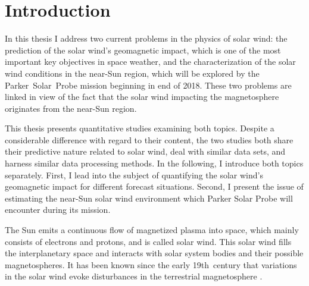 
\chapter{Introduction}
\label{chap:introduction}

In this thesis I address two current problems in the physics of solar wind: the prediction of the solar wind's geomagnetic impact, which is one of the most important key objectives in space weather, and the characterization of the solar wind conditions in the near-Sun region, which will be explored by the Parker~Solar~Probe mission beginning in end of 2018. These two problems are linked in view of the fact that the solar wind impacting the magnetosphere originates from the near-Sun region.

This thesis presents quantitative studies examining both topics. Despite a considerable difference with regard to their content, the two studies both share their predictive nature related to solar wind, deal with similar data sets, and harness similar data processing methods.
In the following, I introduce both topics separately. First, I lead into the subject of quantifying the solar wind's geomagnetic impact for different forecast situations. Second, I present the issue of estimating the near-Sun solar wind environment which Parker Solar Probe will encounter during its mission.

\bigskip


The Sun emits a continuous flow of magnetized plasma into space, which mainly consists of electrons and protons, and is called solar wind. This solar wind fills the interplanetary space and interacts with solar system bodies and their possible magnetospheres. It has been known since the early 19th~century that variations in the solar wind evoke disturbances in the terrestrial magnetosphere \citep{Bartels1962}.


